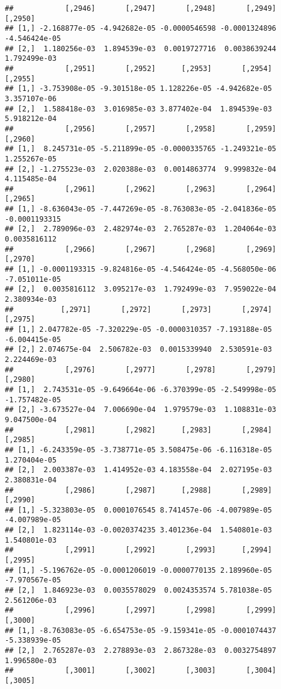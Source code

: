 \documentclass[
]{article}
\begin{document}
\begin{verbatim}
##            [,2946]       [,2947]       [,2948]       [,2949]       [,2950]
## [1,] -2.168877e-05 -4.942682e-05 -0.0000546598 -0.0001324896 -4.546424e-05
## [2,]  1.180256e-03  1.894539e-03  0.0019727716  0.0038639244  1.792499e-03
##            [,2951]       [,2952]      [,2953]       [,2954]      [,2955]
## [1,] -3.753908e-05 -9.301518e-05 1.128226e-05 -4.942682e-05 3.357107e-06
## [2,]  1.588418e-03  3.016985e-03 3.877402e-04  1.894539e-03 5.918212e-04
##            [,2956]       [,2957]       [,2958]       [,2959]      [,2960]
## [1,]  8.245731e-05 -5.211899e-05 -0.0000335765 -1.249321e-05 1.255267e-05
## [2,] -1.275523e-03  2.020388e-03  0.0014863774  9.999832e-04 4.115485e-04
##            [,2961]       [,2962]       [,2963]       [,2964]       [,2965]
## [1,] -8.636043e-05 -7.447269e-05 -8.763083e-05 -2.041836e-05 -0.0001193315
## [2,]  2.789096e-03  2.482974e-03  2.765287e-03  1.204064e-03  0.0035816112
##            [,2966]       [,2967]       [,2968]       [,2969]       [,2970]
## [1,] -0.0001193315 -9.824816e-05 -4.546424e-05 -4.568050e-06 -7.051011e-05
## [2,]  0.0035816112  3.095217e-03  1.792499e-03  7.959022e-04  2.380934e-03
##           [,2971]       [,2972]       [,2973]       [,2974]       [,2975]
## [1,] 2.047782e-05 -7.320229e-05 -0.0000310357 -7.193188e-05 -6.004415e-05
## [2,] 2.074675e-04  2.506782e-03  0.0015339940  2.530591e-03  2.224469e-03
##            [,2976]       [,2977]       [,2978]       [,2979]       [,2980]
## [1,]  2.743531e-05 -9.649664e-06 -6.370399e-05 -2.549998e-05 -1.757482e-05
## [2,] -3.673527e-04  7.006690e-04  1.979579e-03  1.108831e-03  9.047500e-04
##            [,2981]       [,2982]      [,2983]       [,2984]      [,2985]
## [1,] -6.243359e-05 -3.738771e-05 3.508475e-06 -6.116318e-05 1.270404e-05
## [2,]  2.003387e-03  1.414952e-03 4.183558e-04  2.027195e-03 2.380831e-04
##            [,2986]       [,2987]      [,2988]       [,2989]       [,2990]
## [1,] -5.323803e-05  0.0001076545 8.741457e-06 -4.007989e-05 -4.007989e-05
## [2,]  1.823114e-03 -0.0020374235 3.401236e-04  1.540801e-03  1.540801e-03
##            [,2991]       [,2992]       [,2993]      [,2994]       [,2995]
## [1,] -5.196762e-05 -0.0001206019 -0.0000770135 2.189960e-05 -7.970567e-05
## [2,]  1.846923e-03  0.0035578029  0.0024353574 5.781038e-05  2.561206e-03
##            [,2996]       [,2997]       [,2998]       [,2999]       [,3000]
## [1,] -8.763083e-05 -6.654753e-05 -9.159341e-05 -0.0001074437 -5.338939e-05
## [2,]  2.765287e-03  2.278893e-03  2.867328e-03  0.0032754897  1.996580e-03
##            [,3001]       [,3002]       [,3003]       [,3004]       [,3005]

\end{verbatim}
\end{document}
